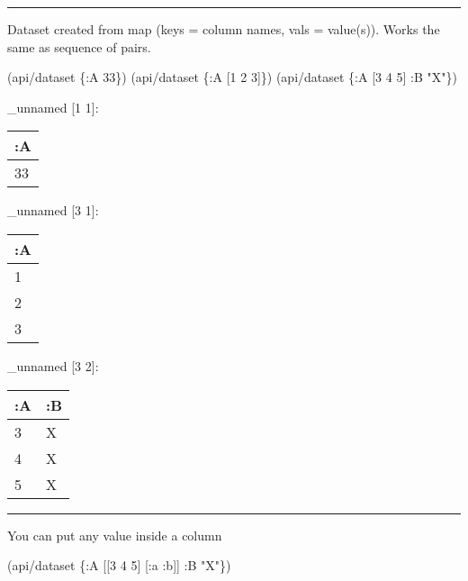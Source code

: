 \documentclass[]{article}
\newenvironment{Shaded}{\begin{snugshade}}{\end{snugshade}}
\newcommand{\DecValTok}[1]{\textcolor[rgb]{0.00,0.00,0.81}{#1}}
\newcommand{\StringTok}[1]{\textcolor[rgb]{0.31,0.60,0.02}{#1}}
\newcommand{\AttributeTok}[1]{\textcolor[rgb]{0.77,0.63,0.00}{#1}}
\newcommand{\NormalTok}[1]{#1}
\begin{document}
\begin{center}\rule{0.5\linewidth}{0.5pt}\end{center}

Dataset created from map (keys = column names, vals = value(s)). Works
the same as sequence of pairs.

\begin{Shaded}
\begin{Highlighting}[]
\NormalTok{(api/dataset \{}\AttributeTok{:A} \DecValTok{33}\NormalTok{\})}
\NormalTok{(api/dataset \{}\AttributeTok{:A}\NormalTok{ [}\DecValTok{1} \DecValTok{2} \DecValTok{3}\NormalTok{]\})}
\NormalTok{(api/dataset \{}\AttributeTok{:A}\NormalTok{ [}\DecValTok{3} \DecValTok{4} \DecValTok{5}\NormalTok{] }\AttributeTok{:B} \StringTok{"X"}\NormalTok{\})}
\end{Highlighting}
\end{Shaded}

\_unnamed {[}1 1{]}:

\begin{longtable}[]{@{}l@{}}
\toprule
:A\tabularnewline
\midrule
\endhead
33\tabularnewline
\bottomrule
\end{longtable}

\_unnamed {[}3 1{]}:

\begin{longtable}[]{@{}l@{}}
\toprule
:A\tabularnewline
\midrule
\endhead
1\tabularnewline
2\tabularnewline
3\tabularnewline
\bottomrule
\end{longtable}

\_unnamed {[}3 2{]}:

\begin{longtable}[]{@{}ll@{}}
\toprule
:A & :B\tabularnewline
\midrule
\endhead
3 & X\tabularnewline
4 & X\tabularnewline
5 & X\tabularnewline
\bottomrule
\end{longtable}

\begin{center}\rule{0.5\linewidth}{0.5pt}\end{center}

You can put any value inside a column

\begin{Shaded}
\begin{Highlighting}[]
\NormalTok{(api/dataset \{}\AttributeTok{:A}\NormalTok{ [[}\DecValTok{3} \DecValTok{4} \DecValTok{5}\NormalTok{] [}\AttributeTok{:a} \AttributeTok{:b}\NormalTok{]] }\AttributeTok{:B} \StringTok{"X"}\NormalTok{\})}
\end{Highlighting}
\end{Shaded}
\end{document}

